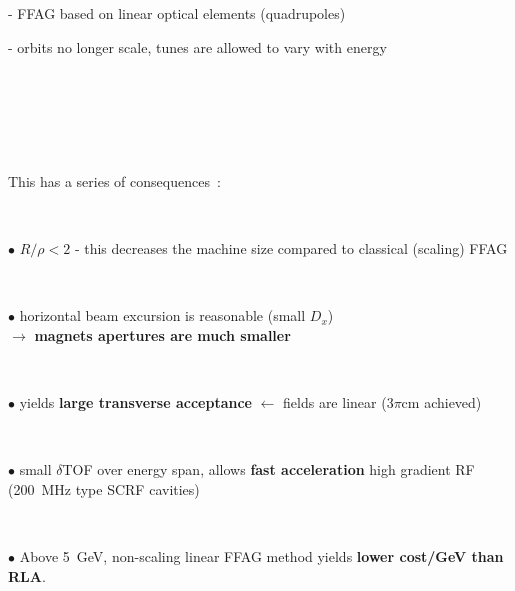 \documentclass[12pt]{article}
\newcommand{\black}{\color{black}}
\newcommand{\blue}{\color{blue}}
\begin{document}
\begin{minipage}[t]{.63\linewidth}


\large   


\noindent - FFAG  based on linear optical elements (quadrupoles) 

\noindent - orbits no longer scale, tunes  are allowed to  vary with energy  

~

~

~

This has a series of consequences~: 

~

\blue   $\bullet$  $R/\rho<2$ - this decreases the machine size compared to classical (scaling) FFAG


~

\black   $\bullet$ horizontal beam excursion is reasonable (small $D_x$) \\
$\rightarrow$ {\bf magnets apertures are much  smaller }

~

\blue   $\bullet$ yields {\bf large transverse acceptance }  $\leftarrow$ fields are linear ($3\pi$cm achieved) 

~

\black   $\bullet$ small $\delta$TOF over  energy span, allows {\bf fast acceleration } 
 high gradient RF (200~MHz type SCRF cavities)

~

\blue  $\bullet$  Above 5~GeV, non-scaling linear  FFAG  method yields  {\bf lower cost/GeV than RLA}. 

\black 




\end{minipage}\hspace{0mm}
\end{document}
